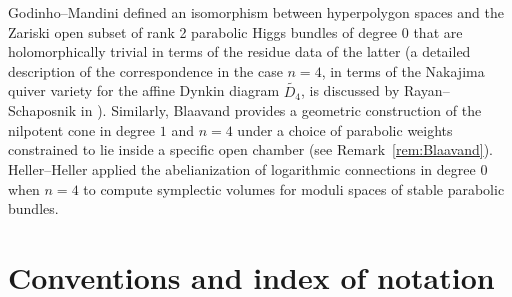 \documentclass[pdftex]{sigma}
\numberwithin{equation}{section}
\begin{document}
Godinho--Mandini \cite{GM13,GM21} defined an isomorphism between hyperpolygon spaces and the Zariski open subset of rank 2 parabolic Higgs bundles of degree $0$ that are holomorphically trivial in terms of the residue data of the latter (a detailed description of the correspondence in the case $n=4$, in terms of the Nakajima quiver variety for the affine Dynkin diagram $\tilde{D_{4}}$, is discussed by Rayan--Schaposnik in \cite[Section 4.3]{RS21}). Similarly, Blaavand \cite{Bla15} provides a geometric construction of the nilpotent cone in degree $1$ and $n=4$ under a choice of parabolic weights constrained to lie inside a specific open chamber (see Remark~\ref{rem:Blaavand}). Heller--Heller \cite{HH16} applied the abelianization of logarithmic connections in degree $0$ when $n=4$ to compute symplectic volumes for moduli spaces of stable parabolic bundles.

\section{Conventions and index of notation}\label{sec:conv}
\end{document}
